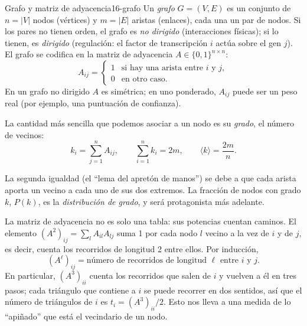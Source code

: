 \begin{definicion}{Grafo y matriz de adyacencia}{16-grafo}
Un \emph{grafo} $G=(V,E)$ es un conjunto de $n=|V|$ nodos (vértices) y $m=|E|$ aristas (enlaces), cada una un par de nodos. Si los pares no tienen orden, el grafo es \emph{no dirigido} (interacciones físicas); si lo tienen, es \emph{dirigido} (regulación: el factor de transcripción $i$ actúa sobre el gen $j$). El grafo se codifica en la matriz de adyacencia $A\in\{0,1\}^{n\times n}$:
\begin{equation}\label{eq:16-adj}
A_{ij}=\begin{cases}1 & \text{si hay una arista entre } i \text{ y } j,\\ 0 & \text{en otro caso.}\end{cases}
\end{equation}
En un grafo no dirigido $A$ es simétrica; en uno ponderado, $A_{ij}$ puede ser un peso real (por ejemplo, una puntuación de confianza).
\end{definicion}

\begin{simbolos}
\end{simbolos}

La cantidad más sencilla que podemos asociar a un nodo es su \emph{grado}, el número de vecinos:
\begin{equation}\label{eq:16-grado}
k_i=\sum_{j=1}^{n}A_{ij},\qquad \sum_{i=1}^{n}k_i = 2m,\qquad \langle k\rangle=\frac{2m}{n}.
\end{equation}
\begin{simbolos}
\end{simbolos}
La segunda igualdad (el ``lema del apretón de manos'') se debe a que cada arista aporta un vecino a cada uno de sus dos extremos. La fracción de nodos con grado $k$, $P(k)$, es la \emph{distribución de grado}, y será protagonista más adelante.

La matriz de adyacencia no es solo una tabla: sus potencias cuentan caminos. El elemento $(A^2)_{ij}=\sum_{l}A_{il}A_{lj}$ suma 1 por cada nodo $l$ vecino a la vez de $i$ y de $j$, es decir, cuenta los recorridos de longitud 2 entre ellos. Por inducción,
\begin{equation}\label{eq:16-caminos}
(A^{\ell})_{ij} = \text{número de recorridos de longitud } \ell \text{ entre } i \text{ y } j.
\end{equation}
En particular, $(A^3)_{ii}$ cuenta los recorridos que salen de $i$ y vuelven a él en tres pasos; cada triángulo que contiene a $i$ se puede recorrer en dos sentidos, así que el número de triángulos de $i$ es $t_i=(A^3)_{ii}/2$. Esto nos lleva a una medida de lo ``apiñado'' que está el vecindario de un nodo.

